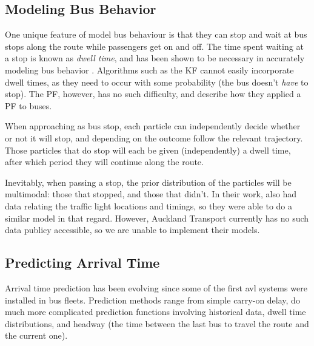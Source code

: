 \documentclass[12pt,a4paper]{article}
\begin{document}







\subsection{Modeling Bus Behavior}
\label{sec:busbehavior}


One unique feature of model bus behaviour is that they can stop and wait at bus stops along the route
while passengers get on and off.
The time spent waiting at a stop is known as \emph{dwell time},
and has been shown to be necessary in accurately modeling bus behavior \citep{cn}.
Algorithms such as the KF cannot easily incorporate dwell times,
as they need to occur with some probability (the bus doesn't \emph{have} to stop).
The PF, however, has no such difficulty,
and \cite{hans-etal:2015} describe how they applied a PF to buses.


When approaching as bus stop,
each particle can independently decide whether or not it will stop,
and depending on the outcome follow the relevant trajectory.
Those particles that do stop will each be given (independently)
a dwell time, after which period they will continue along the route.

Inevitably, when passing a stop, the prior distribution of the particles will be multimodal:
those that stopped, and those that didn't.
In their work, \cite{hans-etal:2015} also had data relating the traffic light locations and
timings, so they were able to do a similar model in that regard.
However, Auckland Transport currently has no such data publicy accessible,
so we are unable to implement their models.



\subsection{Predicting Arrival Time}
\label{sec:arrivaltimeprediction}

Arrival time prediction has been evolving since some of the first \gls{avl}
systems were installed in bus fleets.
Prediction methods range from simple carry-on delay,
do much more complicated prediction functions involving historical data,
dwell time distributions, 
and headway (the time between the last bus to travel the route and the current one).
\end{document}

